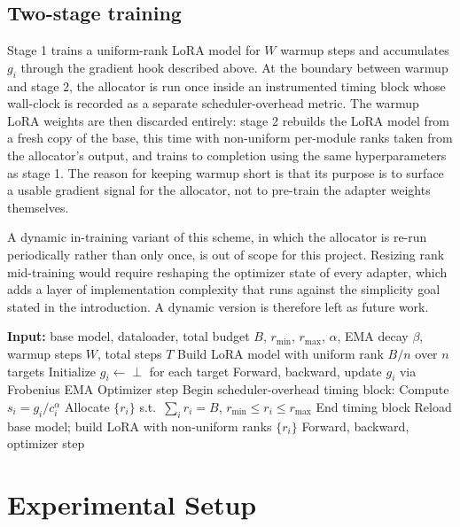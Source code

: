 \documentclass{article}
\begin{document}
\subsection{Two-stage training}
\label{sec:method-twostage}

Stage 1 trains a uniform-rank LoRA model for $W$ warmup steps and
accumulates $g_i$ through the gradient hook described above. At the
boundary between warmup and stage 2, the allocator is run once inside
an instrumented timing block whose wall-clock is recorded as a
separate scheduler-overhead metric. The warmup LoRA weights are then
discarded entirely: stage 2 rebuilds the LoRA model from a fresh copy
of the base, this time with non-uniform per-module ranks taken from
the allocator's output, and trains to completion using the same
hyperparameters as stage 1. The reason for keeping warmup short is
that its purpose is to surface a usable gradient signal for the
allocator, not to pre-train the adapter weights themselves.

A dynamic in-training variant of this scheme, in which the allocator
is re-run periodically rather than only once, is out of scope for this
project. Resizing rank mid-training would require reshaping the
optimizer state of every adapter, which adds a layer of implementation
complexity that runs against the simplicity goal stated in the
introduction. A dynamic version is therefore left as future work.

\begin{algorithm}[t]
\caption{Hardware-Aware Two-Stage LoRA}
\label{alg:hwlora}
\begin{algorithmic}
\STATE \textbf{Input:} base model, dataloader, total budget $B$,
       $r_{\min}$, $r_{\max}$, $\alpha$, EMA decay $\beta$,
       warmup steps $W$, total steps $T$
\STATE Build LoRA model with uniform rank $B/n$ over $n$ targets
\STATE Initialize $g_i \leftarrow \perp$ for each target
   \STATE Forward, backward, update $g_i$ via Frobenius EMA
   \STATE Optimizer step
\ENDFOR
\STATE Begin scheduler-overhead timing block:
\STATE \quad Compute $s_i = g_i / c_i^{\alpha}$
\STATE \quad Allocate $\{r_i\}$ s.t.\ $\sum_i r_i = B$,
       $r_{\min} \le r_i \le r_{\max}$
\STATE End timing block
\STATE Reload base model; build LoRA with non-uniform ranks $\{r_i\}$
   \STATE Forward, backward, optimizer step
\ENDFOR
\end{algorithmic}
\end{algorithm}

\section{Experimental Setup}
\label{sec:setup}
\end{document}
